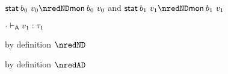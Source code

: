 {\begin{lamportproof*}
    \begin{pfproof}
      \qedstep
        \begin{pfproof}
          {$\estab{\sbnd_0}{\svalue_0} \nredND \emon{\sbnd_0}{\svalue_0}$ and $\estab{\sbnd_1}{\svalue_1} \nredND \emon{\sbnd_1}{\svalue_1}$}
        \end{pfproof}
    \end{pfproof}

    \begin{pfproof}
      \absurdstep
        \begin{pfproof}
          $\snil \sWTA \svalue_1 : \stype_1$
        \end{pfproof}
    \end{pfproof}

    \begin{pfproof}
        \begin{pfproof}
          by definition $\nredND$
        \end{pfproof}
        \begin{pfproof}
          by definition $\nredAD$
        \end{pfproof}
      \qedstep
        \begin{pfproof}
          \begin{mathpar}
          \end{mathpar}
        \end{pfproof}
    \end{pfproof}

\end{lamportproof*}}

